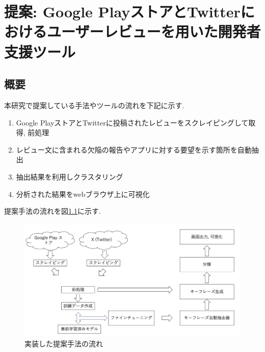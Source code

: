 \chapter{提案: Google PlayストアとTwitterにおけるユーザーレビューを用いた開発者支援ツール}
\label{chap:teian}


\section{概要}
本研究で提案している手法やツールの流れを下記に示す. 

\begin{enumerate}
  \item Google PlayストアとTwitterに投稿されたレビューをスクレイピングして取得, 前処理
  \item レビュー文に含まれる欠陥の報告やアプリに対する要望を示す箇所を自動抽出
  \item 抽出結果を利用しクラスタリング
  \item 分析された結果をwebブラウザ上に可視化
\end{enumerate}

提案手法の流れを図\ref{fig:nagare}に示す. 

\begin{figure}[H]
  \centering
  \includegraphics[scale=0.25]
       {contents/images/zisso_nagare.png}
  \caption{実装した提案手法の流れ\label{fig:nagare}}
\end{figure}



